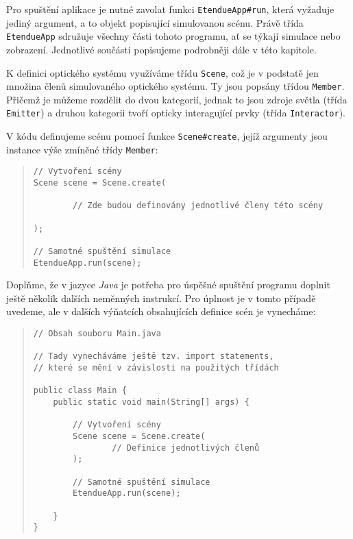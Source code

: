 Pro spuštění aplikace je nutné zavolat funkci \texttt{EtendueApp\#run}, která vyžaduje jediný argument, a to objekt popisující simulovanou scénu. Právě třída \texttt{EtendueApp} sdružuje všechny části tohoto programu, ať se týkají simulace nebo zobrazení. Jednotlivé součásti popisujeme podrobněji dále v této kapitole.

K definici optického systému využíváme třídu \texttt{Scene}, což je v podstatě jen množina členů simulovaného optického systému. Ty jsou popsány třídou \texttt{Member}. Přičemž je můžeme rozdělit do dvou kategorií, jednak to jsou zdroje světla (třída \texttt{Emitter}) a druhou kategorii tvoří opticky interagující prvky (třída \texttt{Interactor}).

V kódu definujeme scénu pomocí funkce \texttt{Scene\#create}, jejíž argumenty jsou instance výše zmíněné třídy \texttt{Member}:

\begin{minipage}{\textwidth}\begin{quote}\begin{lstlisting}
// Vytvoření scény
Scene scene = Scene.create(

        // Zde budou definovány jednotlivé členy této scény

);

// Samotné spuštění simulace
EtendueApp.run(scene);
\end{lstlisting}\end{quote}\end{minipage}

Doplňme, že v jazyce \emph{Java} je potřeba pro úspěšné spuštění programu doplnit ještě několik dalších neměnných instrukcí. Pro úplnost je v tomto případě uvedeme, ale v dalších výňatcích obsahujících definice scén je vynecháme:

\begin{minipage}{\textwidth}\begin{quote}\begin{lstlisting}
// Obsah souboru Main.java

// Tady vynecháváme ještě tzv. import statements,
// které se mění v závislosti na použitých třídách

public class Main {
    public static void main(String[] args) {

        // Vytvoření scény
        Scene scene = Scene.create(
                // Definice jednotlivých členů
        );

        // Samotné spuštění simulace
        EtendueApp.run(scene);

    }
}
\end{lstlisting}\end{quote}\end{minipage}

